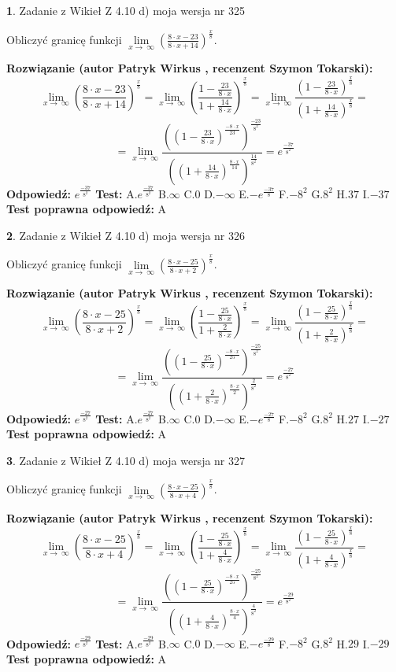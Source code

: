 \documentclass[12pt, a4paper]{article}
\theoremstyle{definition} %
\newtheorem{zad}{}
\newcommand{\zadStart}[1]{\begin{zad}#1\newline}
\newcommand{\zadStop}{\end{zad}}
\newcommand{\rozwStart}[2]{\noindent \textbf{Rozwiązanie (autor #1 , recenzent #2): }\newline}
\newcommand{\rozwStop}{\newline}
\newcommand{\odpStart}{\noindent \textbf{Odpowiedź:}\newline}
\newcommand{\odpStop}{\newline}
\newcommand{\testStart}{\noindent \textbf{Test:}\newline}
\newcommand{\testStop}{\newline}
\newcommand{\kluczStart}{\noindent \textbf{Test poprawna odpowiedź:}\newline}
\newcommand{\kluczStop}{\newline}
\begin{document}
\zadStart{Zadanie z Wikieł Z 4.10 d) moja wersja nr 325}


Obliczyć granicę funkcji  $\lim\limits_{x\to\ \infty}(\frac{8\cdot x-23}{8\cdot x+14})^{\frac{x}{8}}$.
\zadStop
\rozwStart{Patryk Wirkus}{Szymon Tokarski}
$$\lim\limits_{x\to\ \infty}(\frac{8\cdot x-23}{8\cdot x+14})^{\frac{x}{8}} = \lim\limits_{x\to\ \infty}(\frac{1-\frac{23}{8\cdot x}}{1+\frac{14}{8\cdot x}})^{\frac{x}{8}}=\lim\limits_{x\to\ \infty}\frac{(1-\frac{23}{8\cdot x})^{\frac{x}{8}}}{(1+\frac{14}{8\cdot x})^{\frac{x}{8}}}=$$
$$=\lim\limits_{x\to\ \infty}\frac{((1-\frac{23}{8\cdot x})^{\frac{-8\cdot x}{23}})^{\frac{-23}{8^{2}}}}{((1+\frac{14}{8\cdot x})^{\frac{8\cdot x}{14}})^{\frac{14}{8^{2}}}}=e^{\frac{-37}{8^{2}}}$$
\rozwStop
\odpStart
$e^{\frac{-37}{8^{2}}}$
\odpStop
\testStart
A.$e^{\frac{-37}{8^{2}}}$ B.$\infty$ C.$0$ D.$-\infty$ E.$-e^{\frac{-37}{8}}$
F.$-8^{2}$ G.$8^{2}$
H.$37$
I.$-37$
\testStop
\kluczStart
A
\kluczStop



\zadStart{Zadanie z Wikieł Z 4.10 d) moja wersja nr 326}


Obliczyć granicę funkcji  $\lim\limits_{x\to\ \infty}(\frac{8\cdot x-25}{8\cdot x+2})^{\frac{x}{8}}$.
\zadStop
\rozwStart{Patryk Wirkus}{Szymon Tokarski}
$$\lim\limits_{x\to\ \infty}(\frac{8\cdot x-25}{8\cdot x+2})^{\frac{x}{8}} = \lim\limits_{x\to\ \infty}(\frac{1-\frac{25}{8\cdot x}}{1+\frac{2}{8\cdot x}})^{\frac{x}{8}}=\lim\limits_{x\to\ \infty}\frac{(1-\frac{25}{8\cdot x})^{\frac{x}{8}}}{(1+\frac{2}{8\cdot x})^{\frac{x}{8}}}=$$
$$=\lim\limits_{x\to\ \infty}\frac{((1-\frac{25}{8\cdot x})^{\frac{-8\cdot x}{25}})^{\frac{-25}{8^{2}}}}{((1+\frac{2}{8\cdot x})^{\frac{8\cdot x}{2}})^{\frac{2}{8^{2}}}}=e^{\frac{-27}{8^{2}}}$$
\rozwStop
\odpStart
$e^{\frac{-27}{8^{2}}}$
\odpStop
\testStart
A.$e^{\frac{-27}{8^{2}}}$ B.$\infty$ C.$0$ D.$-\infty$ E.$-e^{\frac{-27}{8}}$
F.$-8^{2}$ G.$8^{2}$
H.$27$
I.$-27$
\testStop
\kluczStart
A
\kluczStop



\zadStart{Zadanie z Wikieł Z 4.10 d) moja wersja nr 327}


Obliczyć granicę funkcji  $\lim\limits_{x\to\ \infty}(\frac{8\cdot x-25}{8\cdot x+4})^{\frac{x}{8}}$.
\zadStop
\rozwStart{Patryk Wirkus}{Szymon Tokarski}
$$\lim\limits_{x\to\ \infty}(\frac{8\cdot x-25}{8\cdot x+4})^{\frac{x}{8}} = \lim\limits_{x\to\ \infty}(\frac{1-\frac{25}{8\cdot x}}{1+\frac{4}{8\cdot x}})^{\frac{x}{8}}=\lim\limits_{x\to\ \infty}\frac{(1-\frac{25}{8\cdot x})^{\frac{x}{8}}}{(1+\frac{4}{8\cdot x})^{\frac{x}{8}}}=$$
$$=\lim\limits_{x\to\ \infty}\frac{((1-\frac{25}{8\cdot x})^{\frac{-8\cdot x}{25}})^{\frac{-25}{8^{2}}}}{((1+\frac{4}{8\cdot x})^{\frac{8\cdot x}{4}})^{\frac{4}{8^{2}}}}=e^{\frac{-29}{8^{2}}}$$
\rozwStop
\odpStart
$e^{\frac{-29}{8^{2}}}$
\odpStop
\testStart
A.$e^{\frac{-29}{8^{2}}}$ B.$\infty$ C.$0$ D.$-\infty$ E.$-e^{\frac{-29}{8}}$
F.$-8^{2}$ G.$8^{2}$
H.$29$
I.$-29$
\testStop
\kluczStart
A
\kluczStop
\end{document}
